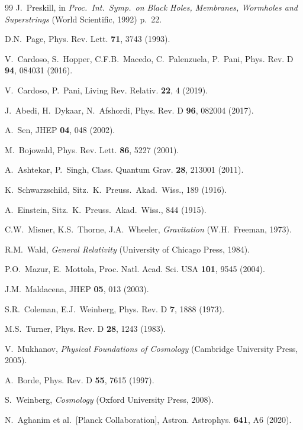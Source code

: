 \documentclass[epj]{svjour}
\begin{document}
\begin{thebibliography}{99}
J.~Preskill, in \emph{Proc.\ Int.\ Symp.\ on Black Holes, Membranes, Wormholes and Superstrings} (World Scientific, 1992) p.~22.

D.N.~Page, Phys. Rev. Lett. \textbf{71}, 3743 (1993).

V.~Cardoso, S.~Hopper, C.F.B.~Macedo, C.~Palenzuela, P.~Pani, Phys. Rev. D \textbf{94}, 084031 (2016).

V.~Cardoso, P.~Pani, Living Rev. Relativ. \textbf{22}, 4 (2019).

J.~Abedi, H.~Dykaar, N.~Afshordi, Phys. Rev. D \textbf{96}, 082004 (2017).

A.~Sen, JHEP \textbf{04}, 048 (2002).

M.~Bojowald, Phys. Rev. Lett. \textbf{86}, 5227 (2001).

A.~Ashtekar, P.~Singh, Class. Quantum Grav. \textbf{28}, 213001 (2011).

K.~Schwarzschild, Sitz.\ K.\ Preuss.\ Akad.\ Wiss., 189 (1916).

A.~Einstein, Sitz.\ K.\ Preuss.\ Akad.\ Wiss., 844 (1915).

C.W.~Misner, K.S.~Thorne, J.A.~Wheeler, \emph{Gravitation} (W.H.~Freeman, 1973).

R.M.~Wald, \emph{General Relativity} (University of Chicago Press, 1984).

P.O.~Mazur, E.~Mottola, Proc. Natl. Acad. Sci. USA \textbf{101}, 9545 (2004).

J.M.~Maldacena, JHEP \textbf{05}, 013 (2003).

S.R.~Coleman, E.J.~Weinberg, Phys. Rev. D \textbf{7}, 1888 (1973).

M.S.~Turner, Phys. Rev. D \textbf{28}, 1243 (1983).

V.~Mukhanov, \emph{Physical Foundations of Cosmology} (Cambridge University Press, 2005).

A.~Borde, Phys. Rev. D \textbf{55}, 7615 (1997).

S.~Weinberg, \emph{Cosmology} (Oxford University Press, 2008).

N.~Aghanim et al.\ [Planck Collaboration], Astron. Astrophys. \textbf{641}, A6 (2020).


\end{thebibliography}
\end{document}
